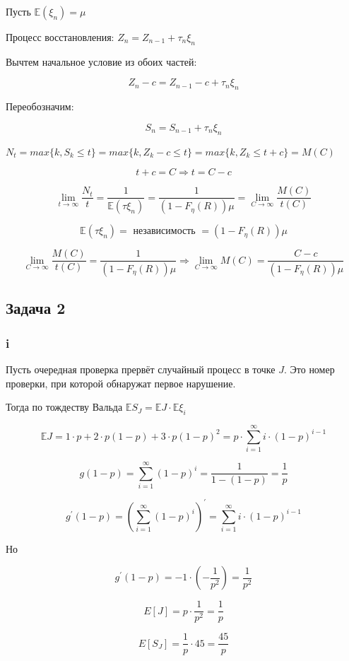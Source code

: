 \documentclass[a4paper,12pt]{article}
\def \mbb{\mathbb}
\def \E{\mbb{E}}
\begin{document}
Пусть $ \E(\xi_n) = \mu $

Процесс восстановления: $ Z_n = Z_{n-1} + \tau_n \xi_n $

Вычтем начальное условие из обоих частей:

\[ Z_n - c = Z_{n-1} - c + \tau_n \xi_n \]

Переобозначим:

\[  S_n = S_{n-1} + \tau_n \xi_n  \]

$ N_t = max\{ k, S_k \le t \} = max\{ k, Z_k - c \le t \} = max\{ k, Z_k \le t + c\} = M(C) $

\[ t + c = C \Rightarrow t = C - c  \]

\[ \lim\limits_{t \to \infty} \frac{N_t}{t} = \frac{1}{\E(\tau \xi_n)} = \frac{1}{(1 - F_\eta(R))\mu} = \lim\limits_{C \to \infty} \frac{M(C)}{t(C)} \]

\[ \E(\tau \xi_n) = \text{ независимость } = (1 - F_\eta(R)) \mu \]


\[ \lim\limits_{C \to \infty} \frac{M(C)}{t(C)} =  \frac{1}{(1 - F_\eta(R))\mu} \Rightarrow  \lim\limits_{C \to \infty} M(C) = \frac{C - c}{(1 - F_\eta(R))\mu} \]

\subsection{Задача 2} 

\subsubsection{i}

Пусть очередная проверка прервёт случайный процесс в точке $ J $. Это номер проверки, при которой обнаружат первое нарушение.

Тогда по тождеству Вальда $ \E S_J = \E J \cdot \E \xi_i $

\[ \E J = 1 \cdot p + 2 \cdot p(1-p) + 3 \cdot p(1-p)^2 = p \cdot \sum_{i=1}^{\infty} i \cdot(1-p)^{i-1} \]

\[
g(1-p) = \sum_{i=1}^{\infty}(1-p)^{i}=\frac{1}{1-(1-p)}=\frac{1}{p}
\]

\[
g^{\prime}(1-p)=\left(\sum_{i=1}^{\infty}(1-p)^{i}\right)^{\prime}=\sum_{i=1}^{\infty} i \cdot(1-p)^{i-1}
\]

Но 

\[
g^{\prime}(1-p)=-1 \cdot\left(-\frac{1}{p^{2}}\right)=\frac{1}{p^{2}}
\]

\[
E[J]=p \cdot \frac{1}{p^{2}}=\frac{1}{p}
\]

\[
E\left[S_{J}\right]=\frac{1}{p} \cdot 45=\frac{45}{p}
\]
\end{document}
